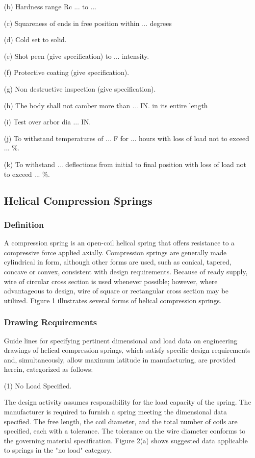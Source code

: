 \documentclass[10pt]{article}
\begin{document}
(b) Hardness range Rc ... to ...

(c) Squareness of ends in free position within ... degrees

(d) Cold set to solid.

(e) Shot peen (give specification) to ... intensity.

(f) Protective coating (give specification).

(g) Non destructive inspection (give specification).

(h) The body shall not camber more than ... IN. in its entire length

(i) Test over arbor dia ... IN.

(j) To withstand temperatures of ... F for ... hours with loss of load not to exceed ... \%.

(k) To withstand ... deflections from initial to final position with loss of load not to exceed ... \%.

\subsection{Helical Compression Springs}

\subsubsection{Definition}
A compression spring is an open-coil helical spring that offers resistance to a compressive force applied axially. 
Compression springs are generally made cylindrical in form, although other forms are used, such as conical, tapered, concave or convex, consistent with design requirements. 
Because of ready supply, wire of circular cross section is used whenever possible; however, where advantageous to design, wire of
square or rectangular cross section may be utilized. 
Figure 1 illustrates several forms of helical compression springs.

\subsubsection{Drawing Requirements}
Guide lines for specifying pertinent dimensional and load data on engineering drawings of helical compression springs, which satisfy specific design requirements and, simultaneously, allow maximum latitude in manufacturing, are provided herein, categorized as follows:

(1) No Load Specified. 

The design activity assumes responsibility for the load capacity of the spring. 
The manufacturer is required to furnish a spring meeting the dimensional data specified. 
The free length, the coil diameter, and the total number of coils are specified, each with a tolerance.
The tolerance on the wire diameter conforms to the governing material specification.
Figure 2(a) shows suggested data applicable to springs in the "no load" category.
\end{document}
